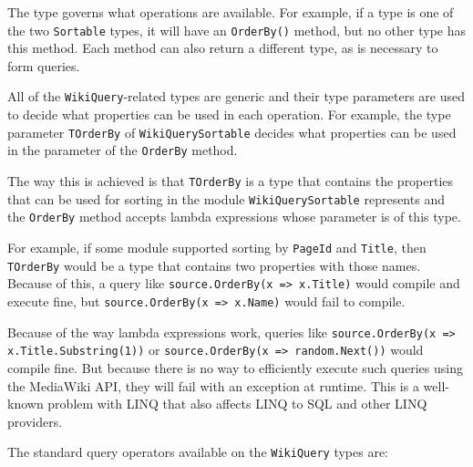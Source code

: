 The type governs what operations are available.
For example, if a type is one of the two \lstinline{Sortable} types,
it will have an \lstinline{OrderBy()} method, but no other type has this method.
Each method can also return a different type, as is necessary to form queries.

\medskip

All of the \lstinline{WikiQuery}-related types are generic
and their type parameters are used to decide what properties can be used in each operation.
For example, the type parameter \lstinline{TOrderBy} of \lstinline{WikiQuerySortable}
decides what properties can be used in the parameter of the \lstinline{OrderBy} method.

The way this is achieved is that \lstinline{TOrderBy} is a type that contains the properties that can be
used for sorting in the module \lstinline{WikiQuerySortable} represents
and the \lstinline{OrderBy} method accepts lambda expressions whose parameter is of this type.

For example, if some module supported sorting by \lstinline{PageId} and \lstinline{Title},
then \lstinline{TOrderBy} would be a type that contains two properties with those names.
Because of this, a query like \lstinline{source.OrderBy(x => x.Title)} would compile and execute fine,
but \lstinline{source.OrderBy(x => x.Name)} would fail to compile.

Because of the way lambda expressions work, queries like \lstinline[breaklines=true]{source.OrderBy(x => x.Title.Substring(1))} or \lstinline{source.OrderBy(x => random.Next())} would compile fine.
But because there is no way to efficiently execute such queries using the MediaWiki \ac{API},
they will fail with an exception at runtime.
This is a well-known problem with LINQ that also affects LINQ to SQL \cite{linq-to-sql-functions}
and other LINQ providers.

\medskip

The standard query operators available on the \lstinline{WikiQuery} types are:


